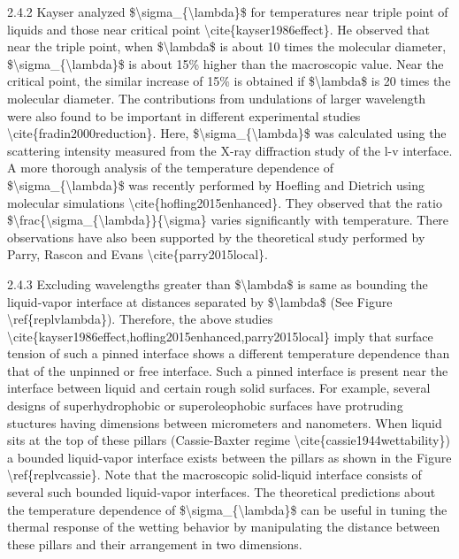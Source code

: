 \par 2.4.2 Kayser analyzed \$\textbackslash sigma\_\{\textbackslash lambda\}\$ for temperatures near triple point of liquids and those near critical point \textbackslash cite\{kayser1986effect\}. He observed that near the triple point, when \$\textbackslash lambda\$ is about 10 times the molecular diameter, \$\textbackslash sigma\_\{\textbackslash lambda\}\$ is about 15\% higher than the macroscopic value. Near the critical point, the similar increase of 15\% is obtained if \$\textbackslash lambda\$ is 20 times the molecular diameter. The contributions from undulations of larger wavelength were also found to be important in different experimental studies \textbackslash cite\{fradin2000reduction\}. Here, \$\textbackslash sigma\_\{\textbackslash lambda\}\$ was calculated using the scattering intensity measured from the X-ray diffraction study of the l-v interface. A more thorough analysis of the temperature dependence of \$\textbackslash sigma\_\{\textbackslash lambda\}\$ was recently performed by Hoefling and Dietrich using molecular simulations \textbackslash cite\{hofling2015enhanced\}. They observed that the ratio \$\textbackslash frac\{\textbackslash sigma\_\{\textbackslash lambda\}\}\{\textbackslash sigma\} varies significantly with temperature. There observations have also been supported by the theoretical study performed by Parry, Rascon and Evans \textbackslash cite\{parry2015local\}.
\par 2.4.3  Excluding wavelengths greater than \$\textbackslash lambda\$ is same as bounding the liquid-vapor interface at distances separated by \$\textbackslash lambda\$ (See Figure \textbackslash ref\{replvlambda\}). Therefore, the above studies \textbackslash cite\{kayser1986effect,hofling2015enhanced,parry2015local\} imply that surface tension of such a pinned interface shows a different temperature dependence than that of the unpinned or free interface. Such a pinned interface is present near the interface between liquid and certain rough solid surfaces. For example, several designs of superhydrophobic or superoleophobic surfaces have protruding stuctures having dimensions between micrometers and nanometers. When liquid sits at the top of these pillars (Cassie-Baxter regime \textbackslash cite\{cassie1944wettability\}) a bounded liquid-vapor interface exists between the pillars as shown in the Figure \textbackslash ref\{replvcassie\}. Note that the macroscopic solid-liquid interface consists of several such bounded liquid-vapor interfaces. The theoretical predictions about the temperature dependence of \$\textbackslash sigma\_\{\textbackslash lambda\}\$ can be useful in tuning the thermal response of the wetting behavior by manipulating the distance between these pillars and their arrangement in two dimensions.
